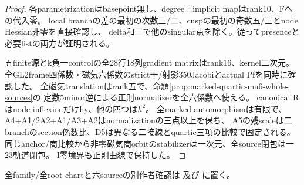 \documentclass[a4paper,11pt]{ltjsarticle}
\theoremstyle{definition}
\begin{document}
\begin{proof}
各parametrizationはbasepoint無し、degree三implicit mapはrank10、Fへの代入零。
local branchの差の最初の次数三/二、cuspの最初の奇数五/三とnode Hessian非零を直接確認し、
delta和三で他のsingular点を除く。従ってpresenceと必要listの両方が証明される。

五finite源とk負一controlの全28行18列gradient matrixはrank16、kernel二次元。
全GL2frame四係数・磁気六係数のstrict十/射影350Jacobiとactual Pfを同時に確認した。
全磁気translationはrank五で、命題\ref{prop:marked-quartic-mu6-whole-sources}の
定数5minor逆による正則normalizerを全六係数へ使える。
canonical Rはnode-inflexionだけhy、他の四つは$h^2$。
全marked automorphismは有限で、A4+A1/2A2+A1/A3+A2はnormalizationの三点以上を保ち、
A5の残scaleは二branchのsection係数比、D5は異なる二接線とquartic三項の比較で固定される。
同じanchor/商比較から非零磁気商orbitのstabilizerは一次元、全source閉包は一23軌道閉包。
I零境界も正則曲線で保持した。
\end{proof}
全family/全root chartと六sourceの別作者確認は
及び
に置く。
\end{document}

